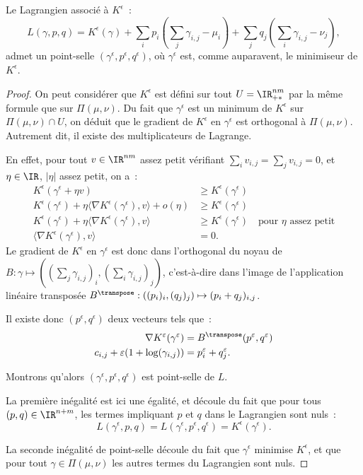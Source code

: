 \begin{lemma}\label{lemma:pt_selle}
Le Lagrangien associé à $K^\epsilon$~:
\[
L(\gamma, p, q) = K^\epsilon(\gamma) +
 \sum_i p_i \left(\sum_j \gamma_{i,j} - \mu_i\right) + 
 \sum_j q_j\left(\sum_i \gamma_{i,j} - \nu_j\right) ,
\]
admet un point-selle $(\gamma^\epsilon,p^\epsilon,q^\epsilon)$, où $\gamma^\epsilon$ est, comme auparavent, le minimiseur de $K^\epsilon$.
\end{lemma}
\begin{proof}
On peut considérer que $K^\epsilon$ est défini sur tout $U = \IR_{+*}^{nm}$ par la même formule que sur $\Pi(\mu,\nu)$. Du fait que $\gamma^\epsilon$ est un minimum de $K^\epsilon$ sur $\Pi(\mu,\nu) \cap U$, on déduit que le gradient de $K^\epsilon$ en $\gamma^\epsilon$ est orthogonal à $\Pi(\mu,\nu)$. Autrement dit, il existe des multiplicateurs de Lagrange.

En effet, pour tout $v \in \IR^{nm}$ assez petit vérifiant $\sum_i v_{i,j} = \sum_j v_{i,j} = 0$, et $\eta \in \IR$, $|\eta|$ assez petit, on a~:
\[ \begin{split}
K^\epsilon(\gamma^\epsilon + \eta v) &\ge K^\epsilon(\gamma^\epsilon) \\
K^\epsilon(\gamma^\epsilon) + \eta \langle \nabla K^\epsilon(\gamma^\epsilon) , v \rangle + o(\eta)  &\ge K^\epsilon(\gamma^\epsilon) \\
K^\epsilon(\gamma^\epsilon) + \eta \langle \nabla K^\epsilon(\gamma^\epsilon) , v \rangle &\ge K^\epsilon(\gamma^\epsilon) \quad \text{pour $\eta$ assez petit} \\
\langle \nabla K^\epsilon(\gamma^\epsilon) , v \rangle &= 0 .
\end{split}\]
Le gradient de $K^\epsilon$ en $\gamma^\epsilon$ est donc dans l'orthogonal du noyau de $B : \gamma \mapsto ((\sum_j \gamma_{i,j})_i, (\sum_i \gamma_{i,j})_j)$, c'est-à-dire dans l'image de l'application linéaire transposée $B^\transpose : ((p_i)_i,(q_j)_j) \mapsto (p_i+q_j)_{i,j}$.

Il existe donc $(p^\epsilon,q^\epsilon)$ deux vecteurs tels que~:
\[\begin{split}
\nabla K^\epsilon(\gamma^\epsilon) &= B^\transpose (p^\epsilon,q^\epsilon)  \\
c_{i,j} + \epsilon (1+\log(\gamma_{i,j})) &= p^\epsilon_i + q^\epsilon_j .
\end{split}\]

Montrons qu'alors $(\gamma^\epsilon,p^\epsilon,q^\epsilon)$ est point-selle de $L$.

La première inégalité est ici une égalité, et découle du fait que pour tous $(p,q) \in \IR^{n+m}$, les termes impliquant $p$ et $q$ dans le Lagrangien sont nuls~:
\[ L(\gamma^\epsilon,p,q) = L(\gamma^\epsilon,p^\epsilon,q^\epsilon) = K^\epsilon(\gamma^\epsilon) .\]

La seconde inégalité de point-selle découle du fait que $\gamma^\epsilon$ minimise $K^\epsilon$, et que pour tout $\gamma \in \Pi(\mu,\nu)$ les autres termes du Lagrangien sont nuls.
\end{proof}


